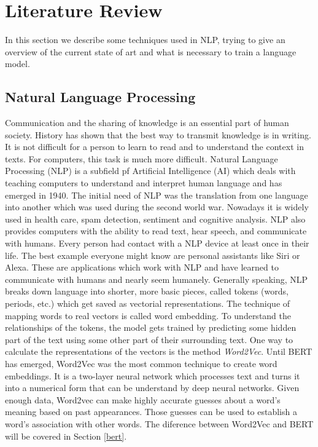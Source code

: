 \chapter{Literature Review} \label{chapter:literaturereview}
In this section we describe some techniques used in NLP, trying to give an overview of the current state of art and what is necessary to train a language model.

\section{Natural Language Processing}
\alert{Communication and the sharing of knowledge is an essential part of human society. History has shown that the best way to transmit knowledge is in writing. It is not difficult for a person to learn to read and to understand the context in texts. For computers, this task is much more difficult. Natural Language Processing (NLP) is a subfield pf Artificial Intelligence (AI) which deals with teaching computers to understand and interpret human language and has emerged in 1940. The initial need of NLP was the translation from one language into another which was used during the second world war. Nowadays it is widely used in health care, spam detection, sentiment and cognitive analysis. NLP also provides computers with the ability to read text, hear speech, and communicate with humans. Every person had contact with a NLP device at least once in their life. The best example everyone might know are personal assistants like Siri or Alexa. These are applications which work with NLP and have learned to communicate with humans and nearly seem humanely.\newline
Generally speaking, NLP breaks down language into shorter, more basic pieces, called tokens (words, periods, etc.) which get saved as vectorial representations. The technique of mapping words to real vectors is called word embedding. To understand the relationships of the tokens, the model gets trained by predicting some hidden part of the text using some other part of their surrounding text. One way to calculate the representations of the vectors is the method \textit{Word2Vec}. Until BERT has emerged, Word2Vec was the most common technique to create word embeddings. It is a two-layer neural network which processes text and turns it into a numerical form that can be understand by deep neural networks. Given enough data, Word2vec can make highly accurate guesses about a word’s meaning based on past appearances. Those guesses can be used to establish a word’s association with other words. The diference between Word2Vec and BERT will be covered in Section \ref{bert}}.

